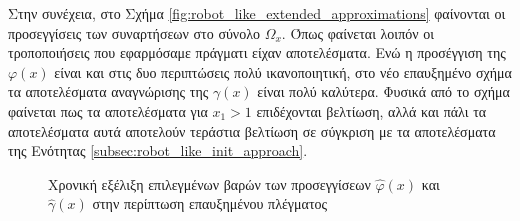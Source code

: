 Στην συνέχεια, στο 
Σχήμα \ref{fig:robot_like_extended_approximations} φαίνονται οι προσεγγίσεις των συναρτήσεων στο σύνολο $\Omega_x$. Όπως φαίνεται λοιπόν οι τροποποιήσεις που εφαρμόσαμε πράγματι είχαν αποτελέσματα. Ενώ η προσέγγιση της $\varphi(x)$ είναι και στις δυο περιπτώσεις πολύ ικανοποιητική, στο νέο επαυξημένο σχήμα τα αποτελέσματα αναγνώρισης της $\gamma(x)$ είναι πολύ καλύτερα. Φυσικά από το σχήμα φαίνεται πως τα αποτελέσματα για $x_1 > 1$ επιδέχονται βελτίωση, αλλά και πάλι τα αποτελέσματα αυτά αποτελούν τεράστια βελτίωση σε σύγκριση με τα αποτελέσματα της Ενότητας \ref{subsec:robot_like_init_approach}.


\begin{figure}
	\begin{subfigure}{0.5\textwidth}
		
	\end{subfigure}
	\begin{subfigure}{0.5\textwidth}
		
	\end{subfigure}
	\caption{Χρονική εξέλιξη επιλεγμένων βαρών των προσεγγίσεων $\hat{\varphi}(x)$ και $\hat{\gamma}(x)$ στην περίπτωση επαυξημένου πλέγματος}
	\label{fig:robot_like_extended_w_conv}
\end{figure}


